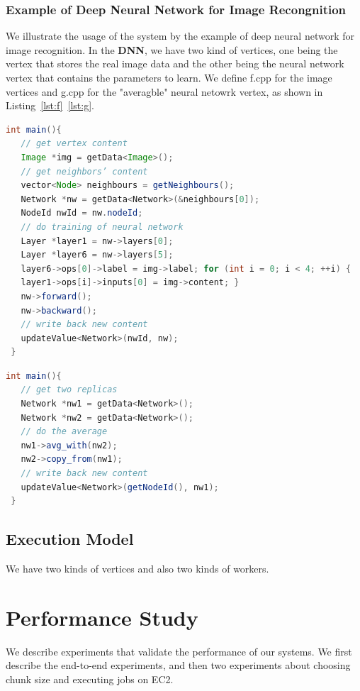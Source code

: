 \documentclass[11pt]{article}
\begin{document}
\subsubsection{Example of Deep Neural Network for Image Recongnition}
We illustrate the usage of the system by the example of deep	neural	network	
for image recognition. In the \textbf{DNN}, we have two kind of vertices, one 
being the vertex that stores the real image data and the other being the neural 
network vertex that contains the parameters to learn. 
We define \textsf{f.cpp} for the image vertices and \textsf{g.cpp} for the 
"averagble" neural netowrk vertex, as shown in Listing~\ref{lst:f}~\ref{lst:g}.
\begin{lstlisting}[language=java,basicstyle={\ttfamily\small},caption={f.cpp},label={lst:f},frame=single]
 int main(){ 
   // get vertex content
   Image *img = getData<Image>();
   // get neighbors’ content 
   vector<Node> neighbours = getNeighbours(); 
   Network *nw = getData<Network>(&neighbours[0]); 
   NodeId nwId = nw.nodeId;
   // do training of neural network
   Layer *layer1 = nw->layers[0];
   Layer *layer6 = nw->layers[5];
   layer6->ops[0]->label = img->label; for (int i = 0; i < 4; ++i) {
   layer1->ops[i]->inputs[0] = img->content; }
   nw->forward();
   nw->backward();
   // write back new content 
   updateValue<Network>(nwId, nw);
 }
\end{lstlisting}
\begin{lstlisting}[language=java,basicstyle={\ttfamily\small},caption={g.cpp},label={lst:g},frame=single]
 int main(){ 
   // get two replicas 
   Network *nw1 = getData<Network>(); 
   Network *nw2 = getData<Network>();
   // do the average 
   nw1->avg_with(nw2); 
   nw2->copy_from(nw1);
   // write back new content 
   updateValue<Network>(getNodeId(), nw1);
 } 
\end{lstlisting}

\subsection{Execution Model}
We have two kinds of vertices and also two kinds of workers. 
\section{Performance Study} \label{sec:perf}

We describe experiments that validate the performance of our systems.
We first describe the end-to-end experiments, and then two
experiments about choosing chunk size and executing jobs on EC2.
\end{document}
